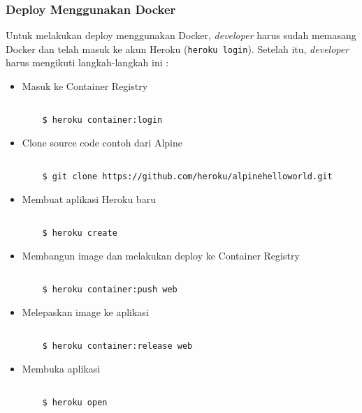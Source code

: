 \subsubsection{Deploy Menggunakan Docker}
Untuk melakukan deploy menggunakan Docker, \textit{developer} harus sudah memasang Docker dan telah masuk ke akun Heroku (\texttt{heroku login}). Setelah itu, \textit{developer} harus mengikuti langkah-langkah ini :
\begin{itemize}
\item Masuk ke Container Registry
\begin{lstlisting}

	$ heroku container:login

\end{lstlisting}

\item Clone source code contoh dari Alpine
\begin{lstlisting}

	$ git clone https://github.com/heroku/alpinehelloworld.git

\end{lstlisting}

\item Membuat aplikasi Heroku baru
\begin{lstlisting}

	$ heroku create

\end{lstlisting}

\item Membangun image dan melakukan deploy ke Container Registry
\begin{lstlisting}

	$ heroku container:push web

\end{lstlisting}

\item Melepaskan image ke aplikasi
\begin{lstlisting}

	$ heroku container:release web

\end{lstlisting}
\item Membuka aplikasi
\begin{lstlisting}

	$ heroku open

\end{lstlisting}
\end{itemize}

